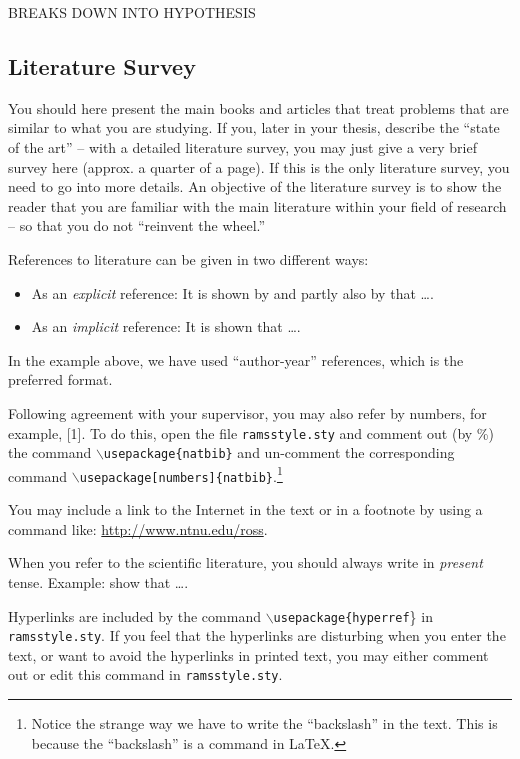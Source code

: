 BREAKS DOWN INTO HYPOTHESIS
\subsection*{Literature Survey}
You should here present the main books and articles that treat problems that are similar to what  you are studying. If you,  later in your thesis, describe the ``state of the art'' -- with a detailed literature survey, you may just give a very brief survey here (approx. a quarter of a page). If this is the only literature survey, you need to go into more details. An objective of the literature survey is to show the reader that you are familiar with the main literature within your field of research -- so that you do not ``reinvent the wheel.''


References to literature can be given in two different ways:
\begin{itemize}
\item As an \emph{explicit} reference: It is shown by \citet{lundteigen08} and partly also by \citet{rausand04}  that \ldots.
\item As an \emph{implicit} reference: It is shown \citep[e.g., see][Chap. 4]{rausand04} that \ldots.
\end{itemize}
In the example above, we have used ``author-year'' references, which is the preferred format. 
\begin{remark}
Following agreement with your supervisor, you may also refer by numbers, for example,  [1]. To do this, open the file \texttt{ramsstyle.sty} and  comment out (by \%) the command \texttt{$\backslash$usepackage\{natbib\}} and un-comment the corresponding command \texttt{$\backslash$usepackage[numbers]\{natbib\}}.\footnote{Notice the strange way we have to write the ``backslash'' in the text. This is because the ``backslash'' is a command in \LaTeX.}
\end{remark}
 You may include a link to the Internet in the text or in a footnote by using a command like: \url{http://www.ntnu.edu/ross}. 

When you refer to the scientific literature, you should always write in \emph{present} tense. Example: \citet{rausand04} show that \ldots.

\begin{remark}
Hyperlinks are included by the command \texttt{$\backslash$usepackage\{hyperref}\} in \texttt{ramsstyle.sty}. If you feel that the hyperlinks are disturbing when you enter the text, or want to avoid the hyperlinks in printed text, you may either comment out or edit this command in \texttt{ramsstyle.sty}.
\end{remark}
